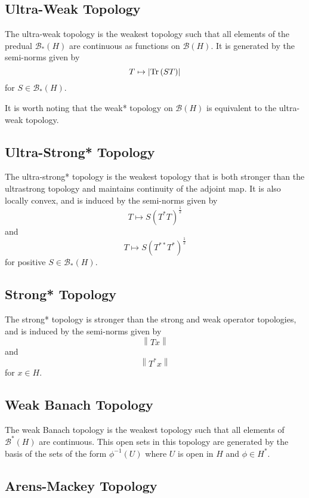 \documentclass{article}
\theoremstyle{plain}
\theoremstyle{definition}
\newcommand{\abs}[1]{\left\lvert #1 \right\rvert}
\newcommand{\norm}[1]{\left\lVert #1 \right\rVert}
\newcommand{\tr}[1]{\textnormal{Tr}\left(#1\right)}
\newcommand{\BH}{\cal{B}(H)}
\newcommand{\DBH}{\cal{B}^*(H)}
\newcommand{\PDBH}{\cal{B}_*(H)}
\renewcommand{\cal}[1]{\mathcal{#1}}
\begin{document}
        \subsection{Ultra-Weak Topology} \label{subsec:UWT}
                The ultra-weak topology is the weakest topology such that all elements of the predual $\PDBH$ are continuous as functions on $\BH$.
                It is generated by the semi-norms given by 
                        $$ T \mapsto \abs{\tr{ST}}$$
                for $S \in \PDBH$.

                It is worth noting that the weak* topology on $\BH$ is equivalent to the ultra-weak topology.
                
        \subsection{Ultra-Strong* Topology} \label{subsec:USST}

                The ultra-strong* topology is the weakest topology that is both stronger than the ultrastrong topology and maintains continuity of the adjoint map. It is also locally convex, and is induced by the semi-norms given by 
                        $$ T \mapsto S(T^* T)^\frac{1}{2} $$
                and 
                        $$ T \mapsto S(T^{**}T^{*})^\frac{1}{2}$$
                for positive $S \in \PDBH$.

        \subsection{Strong* Topology} \label{subsec:SST}

                The strong* topology is stronger than the strong and weak operator topologies, and is induced by the semi-norms given by
                        $$\norm{Tx}$$
                and 
                        $$\norm{T^* x}$$
                for $x \in H$.

        \subsection{Weak Banach Topology} \label{subsec:WBT}

                The weak Banach topology is the weakest topology such that all elements of $\DBH$ are continuous.
                This open sets in this topology are generated by the basis of the sets of the form $\phi^{-1}(U)$ where $U$ is open in $H$ and $\phi \in H^*$.

        \subsection{Arens-Mackey Topology} \label{subsec:AMT}
\end{document}
